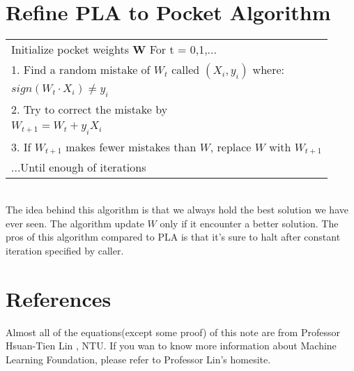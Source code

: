 \documentclass[11pt]{article}
\begin{document}
\section{Refine PLA to Pocket Algorithm}
\begin{tabular}{|l|}
\hline
Initialize pocket weights \textbf{W}
For t = 0,1,...\\

1. Find a random mistake of $\displaystyle{W_{t}}$ called $\displaystyle{(X_{i}, y_{i})}$ where:\\
[3mm]
\indent \indent $\displaystyle{sign\left( W_{t} \cdot X_{i} \right) \neq y_{i}}$\\
[3mm]
2. Try to correct the mistake by\\
[3mm]
\indent \indent $\displaystyle{W_{t+1} = W_t + y_{i}X_{i}}$\\
[3mm]
3. If $W_{t+1}$ makes fewer mistakes than $W$, replace $W$ with $W_{t+1}$\\
...Until enough of iterations\\
\hline
\end{tabular}\\

The idea behind this algorithm is that we always hold the best solution we have ever seen. The algorithm update $W$ only if it encounter a better solution. The pros of this algorithm compared to PLA is that it's sure to halt after constant iteration specified by caller.

\section{References}
Almost all of the equations(except some proof) of this note are from Professor Hsuan-Tien Lin , NTU. If you wan to know more information about Machine Learning Foundation, please refer to Professor Lin's homesite.
\end{document}

